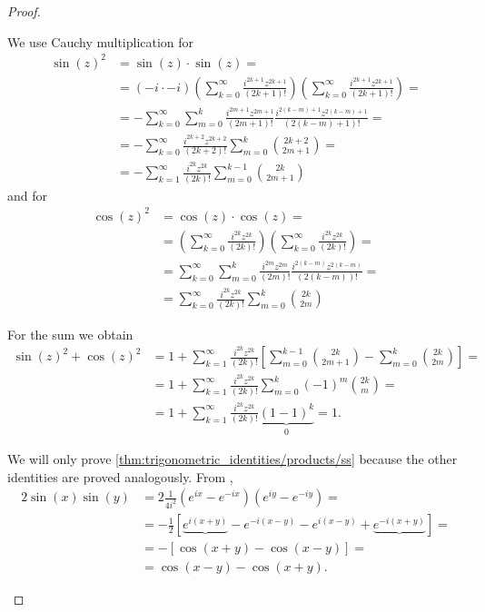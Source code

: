 \begin{proof}
\begin{description}
    We use Cauchy multiplication for
    \begin{align*}
      \sin(z)^2
      &=
      \sin(z) \cdot \sin(z)
      = \\ &=
      (-i \cdot -i) \left( \sum_{k=0}^\infty \frac {i^{2k+1} z^{2k+1}} {(2k+1)!} \right) \left( \sum_{k=0}^\infty \frac {i^{2k+1} z^{2k+1}} {(2k+1)!} \right)
      = \\ &=
      -\sum_{k=0}^\infty \sum_{m=0}^k \frac {i^{2m+1} z^{2m+1}} {(2m+1)!} \frac {i^{2(k-m)+1} z^{2(k-m)+1}} {(2(k-m)+1)!}
      = \\ &=
      -\sum_{k=0}^\infty \frac {i^{2k+2} z^{2k+2}} {(2k+2)!} \sum_{m=0}^k \binom {2k+2} {2m+1}
      = \\ &=
      -\sum_{k=1}^\infty \frac {i^{2k} z^{2k}} {(2k)!} \sum_{m=0}^{k-1} \binom {2k} {2m+1}
    \end{align*}
    and for
    \begin{align*}
      \cos(z)^2
      &=
      \cos(z) \cdot \cos(z)
      = \\ &=
      \left( \sum_{k=0}^\infty \frac {i^{2k} z^{2k}} {(2k)!} \right) \left( \sum_{k=0}^\infty \frac {i^{2k} z^{2k}} {(2k)!} \right)
      = \\ &=
      \sum_{k=0}^\infty \sum_{m=0}^k \frac {i^{2m} z^{2m}} {(2m)!} \frac {i^{2(k-m)} z^{2(k-m)}} {(2(k-m))!}
      = \\ &=
      \sum_{k=0}^\infty \frac {i^{2k} z^{2k}} {(2k)!} \sum_{m=0}^k \binom {2k} {2m}
    \end{align*}

    For the sum we obtain
    \begin{align*}
      \sin(z)^2 + \cos(z)^2
      &=
      1 + \sum_{k=1}^\infty \frac {i^{2k} z^{2k}} {(2k)!} \left[ \sum_{m=0}^{k-1} \binom {2k} {2m+1} - \sum_{m=0}^k \binom {2k} {2m} \right]
      = \\ &=
      1 + \sum_{k=1}^\infty \frac {i^{2k} z^{2k}} {(2k)!} \sum_{m=0}^k (-1)^m \binom {2k} m
      = \\ &=
      1 + \sum_{k=1}^\infty \frac {i^{2k} z^{2k}} {(2k)!} \underbrace{(1 - 1)^k}_0
      =
      1.
    \end{align*}

     We will only prove \ref{thm:trigonometric_identities/products/ss} because the other identities are proved analogously. From ,
    \begin{align*}
      2 \sin(x) \sin(y)
      &=
      2 \frac 1 {4i^2} (e^{ix} - e^{-ix}) (e^{iy} - e^{-iy})
      = \\ &=
      - \frac 1 2 [\underbrace{e^{i(x+y)}} - e^{-i(x-y)} - e^{i(x-y)} + \underbrace{e^{-i(x+y)}}]
      = \\ &=
      - \left[\cos(x + y) - \cos(x - y)\right]
      = \\ &=
      \cos(x - y) - \cos(x + y).
    \end{align*}


\end{description}
\end{proof}
